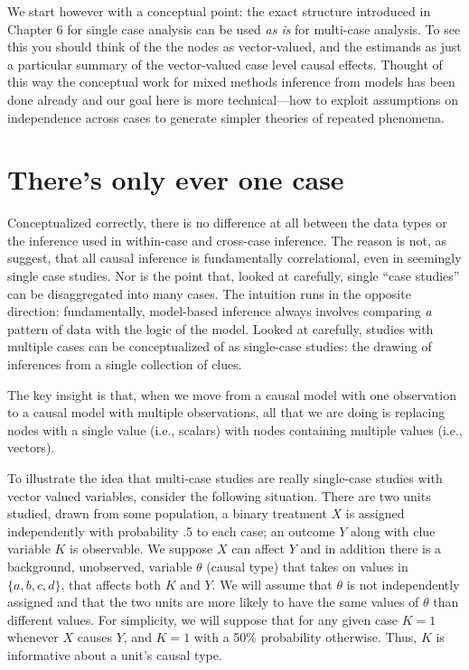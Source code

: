 \documentclass[
  12pt,
]{book}
\begin{document}
We start however with a conceptual point: the exact structure introduced in Chapter 6 for single case analysis can be used \emph{as is} for multi-case analysis. To see this you should think of the the nodes as vector-valued, and the estimands as just a particular summary of the vector-valued case level causal effects. Thought of this way the conceptual work for mixed methods inference from models has been done already and our goal here is more technical---how to exploit assumptions on independence across cases to generate simpler theories of repeated phenomena.

\hypertarget{theres-only-ever-one-case}{%
\section{There's only ever one case}\label{theres-only-ever-one-case}}

Conceptualized correctly, there is no difference at all between the data types or the inference used in within-case and cross-case inference. The reason is not, as \citet{king1994designing} suggest, that all causal inference is fundamentally correlational, even in seemingly single case studies. Nor is the point that, looked at carefully, single ``case studies'' can be disaggregated into many cases. The intuition runs in the opposite direction: fundamentally, model-based inference always involves comparing \emph{a} pattern of data with the logic of the model. Looked at carefully, studies with multiple cases can be conceptualized of as single-case studies: the drawing of inferences from a single collection of clues.

The key insight is that, when we move from a causal model with one observation to a causal model with multiple observations, all that we are doing is replacing nodes with a single value (i.e., scalars) with nodes containing multiple values (i.e., vectors).

To illustrate the idea that multi-case studies are really single-case studies with vector valued variables, consider the following situation. There are two units studied, drawn from some population, a binary treatment \(X\) is assigned independently with probability .5 to each case; an outcome \(Y\) along with clue variable \(K\) is observable. We suppose \(X\) can affect \(Y\) and in addition there is a background, unobserved, variable \(\theta\) (causal type) that takes on values in \(\{a,b,c,d\}\), that affects both \(K\) and \(Y\). We will assume that \(\theta\) is not independently assigned and that the two units are more likely to have the same values of \(\theta\) than different values. For simplicity, we will suppose that for any given case \(K=1\) whenever \(X\) causes \(Y\), and \(K=1\) with a 50\% probability otherwise. Thus, \(K\) is informative about a unit's causal type.
\end{document}
